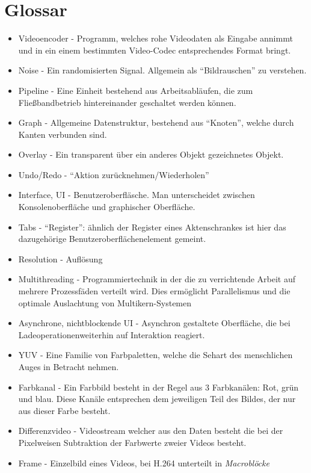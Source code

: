 \section{Glossar}

\begin{itemize}
    \item Videoencoder - Programm, welches rohe Videodaten als Eingabe annimmt und in ein einem bestimmten Video-Codec entsprechendes Format bringt.
    \item Noise - Ein randomisierten Signal. Allgemein als ``Bildrauschen'' zu verstehen.
    \item Pipeline - Eine Einheit bestehend aus Arbeitsabläufen, die zum Fließbandbetrieb hintereinander geschaltet werden können.
    \item Graph - Allgemeine Datenstruktur, bestehend aus ``Knoten'', welche durch Kanten verbunden sind.
    \item Overlay - Ein transparent über ein anderes Objekt gezeichnetes Objekt.
    \item Undo/Redo - ``Aktion zurücknehmen/Wiederholen''
    \item Interface, UI - Benutzeroberfläsche. Man unterscheidet zwischen Konsolenoberfläche und graphischer Oberfläche.
    \item Tabs - ``Register'': ähnlich der Register eines Aktenschrankes ist hier das dazugehörige Benutzeroberflächenelement gemeint.
    \item Resolution - Auflösung
    \item Multithreading - Programmiertechnik in der die zu verrichtende Arbeit auf mehrere Prozessfäden verteilt wird. Dies ermöglicht Parallelismus und die optimale Auslachtung von Multikern-Systemen
    \item Asynchrone, nichtblockende UI - Asynchron gestaltete Oberfläche, die bei Ladeoperationenweiterhin auf Interaktion reagiert.
    \item YUV - Eine Familie von Farbpaletten, welche die Sehart des menschlichen Auges in Betracht nehmen.
    \item Farbkanal - Ein Farbbild besteht in der Regel aus 3 Farbkanälen: Rot, grün und blau. Diese Kanäle entsprechen dem jeweiligen Teil des Bildes, der nur aus dieser Farbe besteht.
    \item Differenzvideo - Videostream welcher aus den Daten besteht die bei der Pixelweisen Subtraktion der Farbwerte zweier Videos besteht.
    \item Frame - Einzelbild eines Videos, bei H.264 unterteilt in \emph{Macroblöcke}

\end{itemize}
